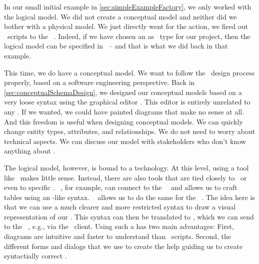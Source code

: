 In our small initial example in \cref{sec:simpleExampleFactory}, we only worked with the logical model.
We did not create a conceptual model and neither did we bother with a physical model.
We just directly went for the action, we fired out \sql\ scripts to the \postgresql\ .
Indeed, if we have chosen an  as \db\ type for our project, then the logical model can be specified in \sql\ -- and that is what we did back in that example.

This time, we do have a conceptual model.
We want to follow the \db\ design process properly, based on a software engineering perspective.
Back in \cref{sec:conceptualSchemaDesign}, we designed our conceptual models based on a very loose syntax using the graphical editor \yEd.
This editor is entirely unrelated to any \dbms.
If we wanted, we could have painted diagrams that make no sense at all.
And this freedom is useful when designing conceptual models.
We can quickly change entity types, attributes, and relationships.
We do not need to worry about technical aspects.
We can discuss our model with stakeholders who don't know anything about \sql.

The logical model, however, is bound to a technology.
At this level, using a tool like \yEd\ makes little sense.
Instead, there are also tools that are tied closely to \sql\ or even to specific .
\mysqlWorkbench~\cite{M2013MWDM}, for example, can connect to the \mysql\ \dbms\ and allows us to craft tables using an \nobreakdashes-like syntax.
\pgmodeler~\cite{AES2006PPDM} allows us to do the same for the \postgresql\ \dbms.
The idea here is that we can use a much clearer and more restricted syntax to draw a visual representation of our \db.
This syntax can then be translated to \sql, which we can send to the \postgresql\ , e.g., via the \psql\ client.
Using such a  has two main advantages:
First, diagrams are intuitive and faster to understand than \sql\ scripts.
Second, the different forms and dialogs that we use to create the  help guiding us to create syntactially correct \sql.

